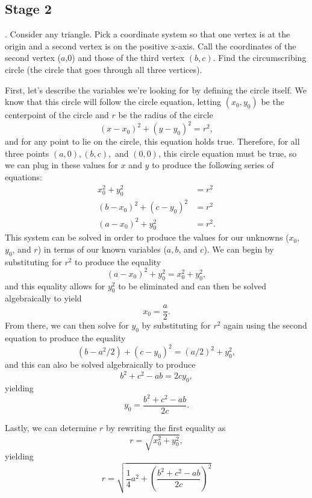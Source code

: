 \documentclass{report}
\newcounter{problemctr}
\newcounter{subproblemctr}[problemctr]
\newcommand{\problem}[1]{%
  \stepcounter{problemctr}%
  \setcounter{subproblemctr}{0}%
  \noindent\arabic{problemctr}. #1\par
}
\newenvironment{answer}
{\begin{minipage}{\linewidth}}
{\end{minipage}}
\begin{document}
\subsection{Stage 2}
\problem{Consider any triangle. Pick a coordinate system so that one vertex is at the origin and a second vertex is on the positive x-axis. Call the coordinates of the second vertex ($a$,0) and those of the third vertex $(b,c)$. Find the circumscribing circle (the circle that goes through all three vertices).}
\begin{answer}
First, let's describe the variables we're looking for by defining the circle itself. We know that this circle will follow the circle equation, letting $(x_0, y_0)$ be the centerpoint of the circle and $r$ be the radius of the circle
\begin{equation*}
(x-x_0)^2 + (y-y_0)^2 = r^2,
\end{equation*}
and for any point to lie on the circle, this equation holds true. Therefore, for all three points $(a,0), (b,c),$ and $(0,0)$, this circle equation must be true, so we can plug in these values for $x$ and $y$ to produce the following series of equations:
\begin{align*}
x_0^2 + y_0^2 &= r^2 \\
(b - x_0)^2 + (c - y_0)^2 &= r^2 \\
(a - x_0)^2 + y_0^2 &= r^2.
\end{align*}
This system can be solved in order to produce the values for our unknowns ($x_0$, $y_0$, and $r$) in terms of our known variables ($a, b$, and $c$). We can begin by substituting for $r^2$ to produce the equality
$$(a-x_0)^2 + y_0^2 = x_0^2 + y_0^2,$$
and this equality allows for $y_0^2$ to be eliminated and can then be solved algebraically to yield
$$x_0 = \frac{a}{2}.$$
From there, we can then solve for $y_0$ by substituting for $r^2$ again using the second equation to produce the equality
$$(b - a^2/2) + (c - y_0)^2 = (a/2)^2 + y_0^2,$$
and this can also be solved algebraically to produce
$$b^2 + c^2 - ab = 2cy_0,$$
yielding
$$y_0 = \frac{b^2 + c^2 - ab}{2c}.$$

Lastly, we can determine $r$ by rewriting the first equality as
$$r = \sqrt{x_0^2 + y_0^2},$$
yielding
$$r = \sqrt{\frac{1}{4} a^2 + \left(\frac{b^2 + c^2 - ab}{2c}\right)^2}$$
\end{answer}
\end{document}
